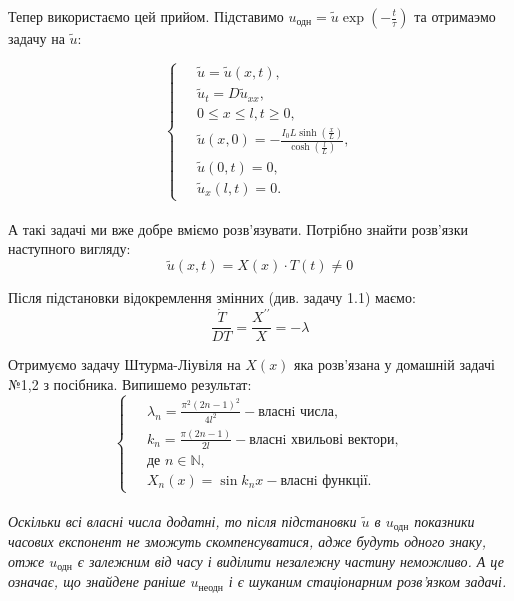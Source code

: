 Тепер використаємо цей прийом. Підставимо $u_{\text{одн}} = \tilde{u}\exp{(-\frac{t}{\tau})}$ та отримаэмо задачу на $\tilde{u}$:

\begin{equation} \label{probcond8}
    \left\{ \begin{aligned} %
            \;&\tilde{u} = \tilde{u}(x,t), \\
            &\tilde{u}_t = D \tilde{u}_{xx}, \\
            &0 \leq x \leq l, t \geq 0, \\
            &\tilde{u}(x,0)=-\frac{I_0L\sinh{(\frac{x}{L})}}{\cosh{(\frac{l}{L})}},\\
            &\tilde{u}(0,t) = 0, \\
            &\tilde{u}_x(l,t) = 0. 
    \end{aligned} \right.
\end{equation}
\\

А такі задачі ми вже добре вміємо розв'язувати. Потрібно знайти розв'язки %
наступного вигляду:
\begin{equation} \label{subst2}
    \tilde{u}(x,t) = X(x) \cdot T(t) \neq 0 
\end{equation}

Після підстановки відокремлення змінних (див. задачу 1.1) маємо:
\begin{equation} \label{managedvar}
    \frac{\dot{T}}{DT} = \frac{X^{\prime\prime}}{X} = - \lambda
\end{equation}

Отримуємо задачу Штурма-Ліувіля на $X(x)$ яка розв'язана у домашній задачі №1,2 з посібника. Випишемо результат:
  \begin{equation} 
        \left\{ \begin{aligned}
            \;&\lambda_n = \frac{\pi^2 (2n-1)^2}{4l^2} - \text{власнi числа},\\
            &k_n = \frac{\pi (2n-1)}{2l} - \text{власнi хвильові вектори},\\
            &\text{де } n \in \mathbb{N},\\ 
            &X_n(x) = \sin k_nx - \text{власнi функції}.
        \end{aligned} \right.
    \end{equation}
\\
\textit{Оскільки всі власні числа додатні, то після підстановки $\tilde{u}$ в $u_{\text{одн}}$ показники часових експонент не зможуть скомпенсуватися, адже будуть одного знаку, отже $u_{\text{одн}}$ є залежним від часу і виділити незалежну частину неможливо. А це означає, що знайдене раніше $u_{\text{неодн}}$ і є шуканим стаціонарним розв'язком задачі.}
\\

